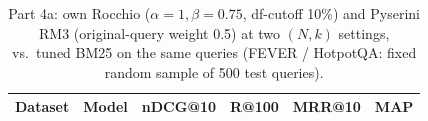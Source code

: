 \begin{table}[ht]\centering\small
\begin{tabular}{llrrrr}\toprule
Dataset & Model & nDCG@10 & R@100 & MRR@10 & MAP \\ \midrule

\bottomrule\end{tabular}
\caption{Part 4a: own Rocchio ($\alpha{=}1,\beta{=}0.75$, df-cutoff 10\%) and Pyserini RM3 (original-query weight 0.5) at two $(N,k)$ settings, vs.\ tuned BM25 on the same queries (FEVER / HotpotQA: fixed random sample of 500 test queries).}\label{tab:p4a}\end{table}

